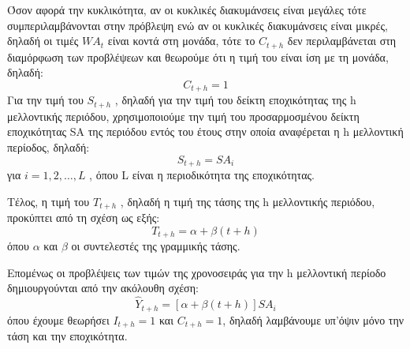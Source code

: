 Όσον αφορά την κυκλικότητα, αν οι κυκλικές διακυμάνσεις είναι μεγάλες τότε
συμπεριλαμβάνονται στην πρόβλεψη ενώ αν οι κυκλικές διακυμάνσεις είναι μικρές,
δηλαδή οι τιμές $WA_t$ είναι κοντά στη μονάδα, τότε το $C_{t+h}$ δεν περιλαμβάνεται στη
διαμόρφωση των προβλέψεων και θεωρούμε ότι η τιμή του είναι ίση με τη μονάδα,
δηλαδή:\\
$$ C_{t+h}=1 $$
Για την τιμή του $S_{t+h}$ , δηλαδή για την τιμή του δείκτη εποχικότητας της h
μελλοντικής περιόδου, χρησιμοποιούμε την τιμή του προσαρμοσμένου δείκτη
εποχικότητας SA της περιόδου εντός του έτους στην οποία αναφέρεται η h
μελλοντική περίοδος, δηλαδή:\\
$$ S_{t+h}=SA_i $$
για $i = 1, 2,\ldots,L$ , όπου L είναι η περιοδικότητα της εποχικότητας.

Τέλος, η τιμή του $T_{t+h}$ , δηλαδή η τιμή της τάσης της h μελλοντικής περιόδου,
προκύπτει από τη σχέση ως εξής:\\
$$ T_{t+h}=\alpha+\beta \left(t+h\right) $$
όπου $\alpha$ και $\beta$ οι συντελεστές της γραμμικής τάσης.

Επομένως οι προβλέψεις των τιμών της χρονοσειράς για την h μελλοντική
περίοδο δημιουργούνται από την ακόλουθη σχέση:\\
$$ \widehat{Y}_{t+h}=\left[\alpha+\beta\left(t+h\right)\right]SA_i  $$
όπου έχουμε θεωρήσει $I_{t+h} = 1$ και $C_{t+h} = 1$, δηλαδή λαμβάνουμε υπ’όψιν μόνο την
τάση και την εποχικότητα.
\endinput
